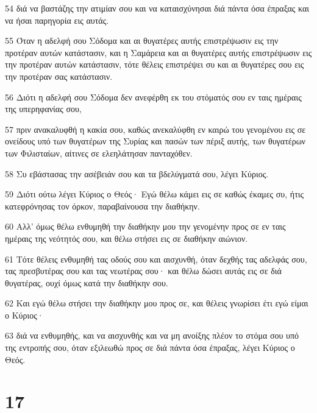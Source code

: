 \par 54 διά να βαστάζης την ατιμίαν σου και να καταισχύνησαι διά πάντα όσα έπραξας και να ήσαι παρηγορία εις αυτάς.
\par 55 Όταν η αδελφή σου Σόδομα και αι θυγατέρες αυτής επιστρέψωσιν εις την προτέραν αυτών κατάστασιν, και η Σαμάρεια και αι θυγατέρες αυτής επιστρέψωσιν εις την προτέραν αυτών κατάστασιν, τότε θέλεις επιστρέψει συ και αι θυγατέρες σου εις την προτέραν σας κατάστασιν.
\par 56 Διότι η αδελφή σου Σόδομα δεν ανεφέρθη εκ του στόματός σου εν ταις ημέραις της υπερηφανίας σου,
\par 57 πριν ανακαλυφθή η κακία σου, καθώς ανεκαλύφθη εν καιρώ του γενομένου εις σε ονείδους υπό των θυγατέρων της Συρίας και πασών των πέριξ αυτής, των θυγατέρων των Φιλισταίων, αίτινες σε ελεηλάτησαν πανταχόθεν.
\par 58 Συ εβάστασας την ασέβειάν σου και τα βδελύγματά σου, λέγει Κύριος.
\par 59 Διότι ούτω λέγει Κύριος ο Θεός· Εγώ θέλω κάμει εις σε καθώς έκαμες συ, ήτις κατεφρόνησας τον όρκον, παραβαίνουσα την διαθήκην.
\par 60 Αλλ' όμως θέλω ενθυμηθή την διαθήκην μου την γενομένην προς σε εν ταις ημέραις της νεότητός σου, και θέλω στήσει εις σε διαθήκην αιώνιον.
\par 61 Τότε θέλεις ενθυμηθή τας οδούς σου και αισχυνθή, όταν δεχθής τας αδελφάς σου, τας πρεσβυτέρας σου και τας νεωτέρας σου· και θέλω δώσει αυτάς εις σε διά θυγατέρας, ουχί όμως κατά την διαθήκην σου.
\par 62 Και εγώ θέλω στήσει την διαθήκην μου προς σε, και θέλεις γνωρίσει έτι εγώ είμαι ο Κύριος·
\par 63 διά να ενθυμηθής, και να αισχυνθής και να μη ανοίξης πλέον το στόμα σου υπό της εντροπής σου, όταν εξιλεωθώ προς σε διά πάντα όσα έπραξας, λέγει Κύριος ο Θεός.

\chapter{17}


